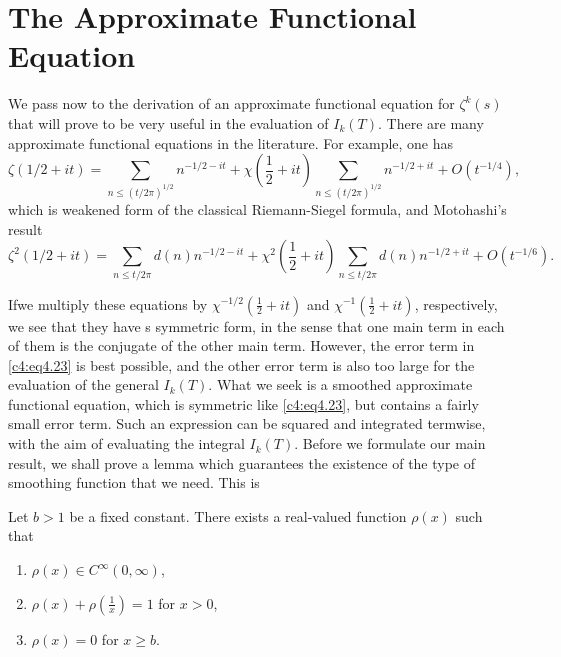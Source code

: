 \section{The Approximate Functional Equation}\label{c4:sec4.2}

We pass now to the derivation of an approximate functional equation
for $\zeta^k(s)$ that will prove to be very useful in the evaluation
of $I_k(T)$. There are many approximate functional equations in the
literature. For example, one has
{\fontsize{10pt}{12pt}\selectfont
\begin{equation}
  \zeta (1/2 + it)= \sum_{n \leq (t/2 \pi)^{1/2}} n^{-1/2 -it}
  + \chi \left(\frac{1}{2} + it \right) \sum_{n \leq (t/2\pi)^{1/2}}
  n^{-1/2 + it}+ O(t^{-1/4}),\label{c4:eq4.23}
\end{equation}}
which is weakened form of the classical Riemann-Siegel formula, and 
Motohashi's result
$$
\zeta^2 (1/2 + it)= \sum_{n \leq t/2 \pi} d(n) n^{-1/2-it} + \chi^2
\left(\frac{1}{2} + it \right) \sum_{n \leq t/2 \pi} d(n) n^{-1/2 +
  it} + O(t^{-1/6}).
$$

If\pageoriginale we multiply these equations by $\chi^{-1/2}
  \left(\frac{1}{2} + it \right)$ and $\chi^{-1} \left(\frac{1}{2} +
  it \right)$, respectively, we see that they have s symmetric form,
  in the sense that one main term in each of them is the conjugate of
  the other main term. However, the error term in \eqref{c4:eq4.23} is
  best possible, and the other error term is also too large for the
  evaluation of the general $I_k (T)$. What we seek is a smoothed
  approximate functional equation, which is symmetric like
  \eqref{c4:eq4.23}, but contains a fairly small error term. Such an
  expression can be squared and integrated termwise, with the aim of
  evaluating the integral $I_k(T)$. Before we formulate our main
  result, we shall prove a lemma which guarantees the existence of the
  type of smoothing function that we need. This is 

\begin{lemma}\label{c4:lem4.3}
  Let $b >1$ be a fixed constant. There exists a real-valued function
  $\rho (x)$ such that 
  \begin{enumerate}[\rm (i)]
    \item $\rho(x) \in C^\infty (0, \infty)$, 

      \item $\rho (x) + \rho \left(\frac{1}{x}\right) =1$ for $x>0$,

        \item $\rho (x) =0$ for $x \geq b$.
  \end{enumerate}
\end{lemma}

